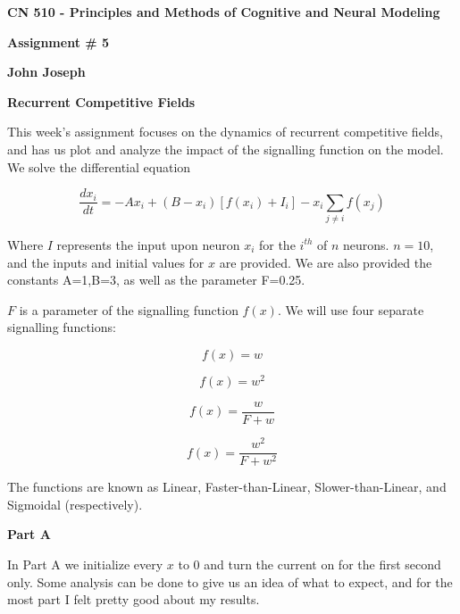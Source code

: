 \documentclass[a4paper,12pt]{article}
\begin{document}
\begin{center}

{\Large\bf CN 510 - Principles and Methods of Cognitive and Neural Modeling}

\bigskip

{\large\bf Assignment \# 5}
\smallskip

{\large\bf John Joseph}
\end{center}

\bigskip
{\bf Recurrent Competitive Fields}
\bigskip

This week's assignment focuses on the dynamics of recurrent competitive fields, and has us plot and analyze the impact of the signalling function on the model. We solve the differential equation

\begin{equation}
  \frac{dx_i}{dt} = -Ax_i+(B-x_i)[f(x_i)+I_i] - x_i\sum\limits_{j \neq i} f(x_j)
\end{equation}

Where $I$ represents the input upon neuron $x_i$ for the $i^{th}$ of $n$ neurons. $n=10$, and the inputs and initial values for $x$ are provided. We are also provided the constants A=1,B=3, as well as the parameter F=0.25. 

\vspace{2mm}

$F$ is a parameter of the signalling function $f(x)$. We will use four separate signalling functions:

\begin{equation}
f(x)=w
\end{equation}

\begin{equation}
f(x)=w^2
\end{equation}

\begin{equation}
f(x)=\frac{w}{F+w}
\end{equation}

\begin{equation}
f(x)=\frac{w^2}{F+w^2}
\end{equation}

The functions are known as Linear, Faster-than-Linear, Slower-than-Linear, and Sigmoidal (respectively). 

\vfil\eject

{\bf Part A}

In Part A we initialize every $x$ to 0 and turn the current on for the first second only. Some analysis can be done to give us an idea of what to expect, and for the most part I felt pretty good about my results. 
\end{document}
